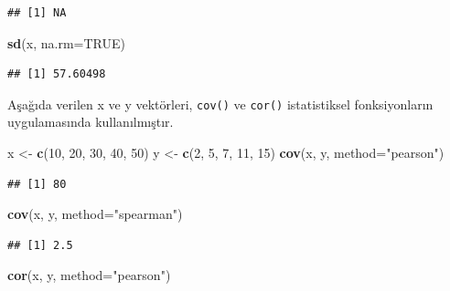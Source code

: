 \documentclass[
]{book}
\newenvironment{Shaded}{\begin{snugshade}}{\end{snugshade}}
\newcommand{\AttributeTok}[1]{\textcolor[rgb]{0.13,0.29,0.53}{#1}}
\newcommand{\ConstantTok}[1]{\textcolor[rgb]{0.56,0.35,0.01}{#1}}
\newcommand{\DecValTok}[1]{\textcolor[rgb]{0.00,0.00,0.81}{#1}}
\newcommand{\FunctionTok}[1]{\textcolor[rgb]{0.13,0.29,0.53}{\textbf{#1}}}
\newcommand{\NormalTok}[1]{#1}
\newcommand{\OtherTok}[1]{\textcolor[rgb]{0.56,0.35,0.01}{#1}}
\newcommand{\StringTok}[1]{\textcolor[rgb]{0.31,0.60,0.02}{#1}}
\begin{document}
\begin{verbatim}
## [1] NA
\end{verbatim}

\begin{Shaded}
\begin{Highlighting}[]
\FunctionTok{sd}\NormalTok{(x, }\AttributeTok{na.rm=}\ConstantTok{TRUE}\NormalTok{)}
\end{Highlighting}
\end{Shaded}

\begin{verbatim}
## [1] 57.60498
\end{verbatim}

Aşağıda verilen x ve y vektörleri, \texttt{cov()} ve \texttt{cor()} istatistiksel fonksiyonların uygulamasında kullanılmıştır.

\begin{Shaded}
\begin{Highlighting}[]
\NormalTok{x }\OtherTok{\textless{}{-}} \FunctionTok{c}\NormalTok{(}\DecValTok{10}\NormalTok{, }\DecValTok{20}\NormalTok{, }\DecValTok{30}\NormalTok{, }\DecValTok{40}\NormalTok{, }\DecValTok{50}\NormalTok{)}
\NormalTok{y }\OtherTok{\textless{}{-}} \FunctionTok{c}\NormalTok{(}\DecValTok{2}\NormalTok{,   }\DecValTok{5}\NormalTok{,  }\DecValTok{7}\NormalTok{, }\DecValTok{11}\NormalTok{, }\DecValTok{15}\NormalTok{)}
\FunctionTok{cov}\NormalTok{(x, y, }\AttributeTok{method=}\StringTok{"pearson"}\NormalTok{)}
\end{Highlighting}
\end{Shaded}

\begin{verbatim}
## [1] 80
\end{verbatim}

\begin{Shaded}
\begin{Highlighting}[]
\FunctionTok{cov}\NormalTok{(x, y, }\AttributeTok{method=}\StringTok{"spearman"}\NormalTok{)}
\end{Highlighting}
\end{Shaded}

\begin{verbatim}
## [1] 2.5
\end{verbatim}

\begin{Shaded}
\begin{Highlighting}[]
\FunctionTok{cor}\NormalTok{(x, y, }\AttributeTok{method=}\StringTok{"pearson"}\NormalTok{)}
\end{Highlighting}
\end{Shaded}
\end{document}
